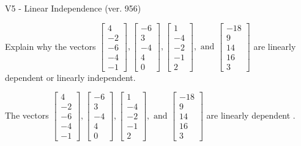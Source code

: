 \begin{exercise}
  \begin{exerciseTitle}V5 - Linear Independence (ver. 956)\end{exerciseTitle}
  \begin{exerciseStatement}
    Explain why the vectors \(\left[\begin{array}{r}
4 \\
-2 \\
-6 \\
-4 \\
-1
\end{array}\right] , \left[\begin{array}{r}
-6 \\
3 \\
-4 \\
4 \\
0
\end{array}\right] , \left[\begin{array}{r}
1 \\
-4 \\
-2 \\
-1 \\
2
\end{array}\right] , \text{ and } \left[\begin{array}{r}
-18 \\
9 \\
14 \\
16 \\
3
\end{array}\right]\) are linearly dependent or linearly independent.	


  \end{exerciseStatement}
  \begin{exerciseAnswer}
   The vectors \(\left[\begin{array}{r}
4 \\
-2 \\
-6 \\
-4 \\
-1
\end{array}\right] , \left[\begin{array}{r}
-6 \\
3 \\
-4 \\
4 \\
0
\end{array}\right] , \left[\begin{array}{r}
1 \\
-4 \\
-2 \\
-1 \\
2
\end{array}\right] , \text{ and } \left[\begin{array}{r}
-18 \\
9 \\
14 \\
16 \\
3
\end{array}\right]\) are 
  	 linearly dependent  .
  


  \end{exerciseAnswer}
\end{exercise}